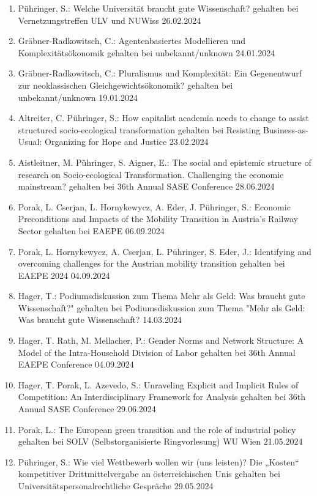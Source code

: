 \begin{enumerate}
	\item Pühringer, S.: Welche Universität braucht gute Wissenschaft? gehalten bei Vernetzungstreffen ULV und NUWiss 26.02.2024
	\item Gräbner-Radkowitsch, C.: Agentenbasiertes Modellieren und Komplexitätsökonomik gehalten bei unbekannt/unknown 24.01.2024
	\item Gräbner-Radkowitsch, C.: Pluralismus und Komplexität: Ein Gegenentwurf zur neoklassischen Gleichgewichtsökonomik? gehalten bei unbekannt/unknown 19.01.2024
	\item Altreiter, C. Pühringer, S.: How capitalist academia needs to change to assist structured socio-ecological transformation gehalten bei Resisting Business-as-Usual: Organizing for Hope and Justice 23.02.2024
	\item Aistleitner, M. Pühringer, S. Aigner, E.: The social and epistemic structure of research on Socio-ecological Transformation. Challenging the economic mainstream? gehalten bei 36th Annual SASE Conference 28.06.2024
	\item Porak, L. Cserjan, L. Hornykewycz, A. Eder, J. Pühringer, S.: Economic Preconditions and Impacts of the Mobility Transition in Austria's Railway Sector gehalten bei EAEPE 06.09.2024
	\item Porak, L. Hornykewycz, A. Cserjan, L. Pühringer, S. Eder, J.: Identifying and overcoming challenges for the Austrian mobility transition gehalten bei EAEPE 2024 04.09.2024
	\item Hager, T.: Podiumsdiskussion zum Thema \glqq Mehr als Geld: Was braucht gute Wissenschaft?" gehalten bei Podiumsdiskussion zum Thema "Mehr als Geld: Was braucht gute Wissenschaft?\grqq{} 14.03.2024
	\item Hager, T. Rath, M.  Mellacher, P.: Gender Norms and Network Structure: A Model of the Intra-Household Division of Labor gehalten bei 36th Annual EAEPE Conference 04.09.2024
	\item Hager, T. Porak, L. Azevedo, S.: Unraveling Explicit and Implicit Rules of Competition: An Interdisciplinary Framework for Analysis gehalten bei 36th Annual SASE Conference 29.06.2024
	\item Porak, L.: The European green transition and the role of industrial policy gehalten bei SOLV (Selbstorganisierte Ringvorlesung) WU Wien 21.05.2024
	\item Pühringer, S.: Wie viel Wettbewerb wollen wir (uns leisten)? Die „Kosten“ kompetitiver Drittmittelvergabe an österreichischen Unis gehalten bei Universitätspersonalrechtliche Gespräche 29.05.2024

\end{enumerate}
